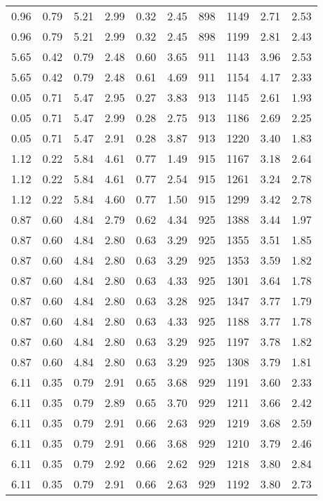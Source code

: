 \begin{longtable}{rrrrrrrrrr}
0.96	&	0.79	&	5.21	&	2.99	&	0.32	&	2.45	&	898	&	1149	&	2.71	&	2.53	\\
0.96	&	0.79	&	5.21	&	2.99	&	0.32	&	2.45	&	898	&	1199	&	2.81	&	2.43	\\
5.65	&	0.42	&	0.79	&	2.48	&	0.60	&	3.65	&	911	&	1143	&	3.96	&	2.53	\\
5.65	&	0.42	&	0.79	&	2.48	&	0.61	&	4.69	&	911	&	1154	&	4.17	&	2.33	\\
0.05	&	0.71	&	5.47	&	2.95	&	0.27	&	3.83	&	913	&	1145	&	2.61	&	1.93	\\
0.05	&	0.71	&	5.47	&	2.99	&	0.28	&	2.75	&	913	&	1186	&	2.69	&	2.25	\\
0.05	&	0.71	&	5.47	&	2.91	&	0.28	&	3.87	&	913	&	1220	&	3.40	&	1.83	\\
1.12	&	0.22	&	5.84	&	4.61	&	0.77	&	1.49	&	915	&	1167	&	3.18	&	2.64	\\
1.12	&	0.22	&	5.84	&	4.61	&	0.77	&	2.54	&	915	&	1261	&	3.24	&	2.78	\\
1.12	&	0.22	&	5.84	&	4.60	&	0.77	&	1.50	&	915	&	1299	&	3.42	&	2.78	\\
0.87	&	0.60	&	4.84	&	2.79	&	0.62	&	4.34	&	925	&	1388	&	3.44	&	1.97	\\
0.87	&	0.60	&	4.84	&	2.80	&	0.63	&	3.29	&	925	&	1355	&	3.51	&	1.85	\\
0.87	&	0.60	&	4.84	&	2.80	&	0.63	&	3.29	&	925	&	1353	&	3.59	&	1.82	\\
0.87	&	0.60	&	4.84	&	2.80	&	0.63	&	4.33	&	925	&	1301	&	3.64	&	1.78	\\
0.87	&	0.60	&	4.84	&	2.80	&	0.63	&	3.28	&	925	&	1347	&	3.77	&	1.79	\\
0.87	&	0.60	&	4.84	&	2.80	&	0.63	&	4.33	&	925	&	1188	&	3.77	&	1.78	\\
0.87	&	0.60	&	4.84	&	2.80	&	0.63	&	3.29	&	925	&	1197	&	3.78	&	1.82	\\
0.87	&	0.60	&	4.84	&	2.80	&	0.63	&	3.29	&	925	&	1308	&	3.79	&	1.81	\\
6.11	&	0.35	&	0.79	&	2.91	&	0.65	&	3.68	&	929	&	1191	&	3.60	&	2.33	\\
6.11	&	0.35	&	0.79	&	2.89	&	0.65	&	3.70	&	929	&	1211	&	3.66	&	2.42	\\
6.11	&	0.35	&	0.79	&	2.91	&	0.66	&	2.63	&	929	&	1219	&	3.68	&	2.59	\\
6.11	&	0.35	&	0.79	&	2.91	&	0.66	&	3.68	&	929	&	1210	&	3.79	&	2.46	\\
6.11	&	0.35	&	0.79	&	2.92	&	0.66	&	2.62	&	929	&	1218	&	3.80	&	2.84	\\
6.11	&	0.35	&	0.79	&	2.91	&	0.66	&	2.63	&	929	&	1192	&	3.80	&	2.73	\\

\end{longtable}
